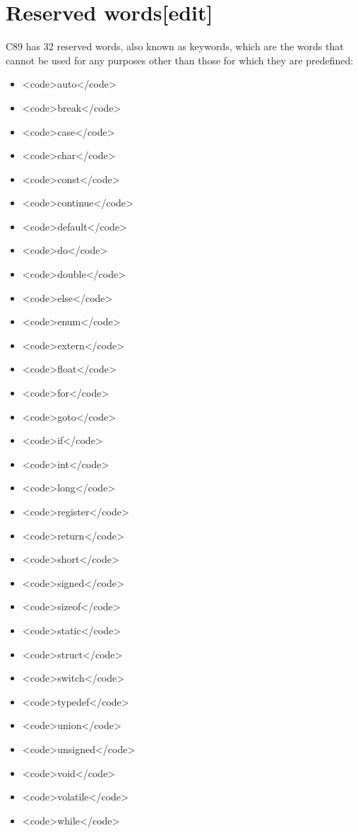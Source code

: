 \documentclass{article}\usepackage{titlesec}
\begin{document}
\section{Reserved words[edit]}
C89 has 32 reserved words, also known as keywords, which are the words that cannot be used for any purposes other than those for which they are predefined:
\\


\begin{itemize}\item<code>auto</code>
\item<code>break</code>
\item<code>case</code>
\item<code>char</code>
\item<code>const</code>
\item<code>continue</code>
\item<code>default</code>
\item<code>do</code>
\item<code>double</code>
\item<code>else</code>
\item<code>enum</code>
\item<code>extern</code>
\item<code>float</code>
\item<code>for</code>
\item<code>goto</code>
\item<code>if</code>
\item<code>int</code>
\item<code>long</code>
\item<code>register</code>
\item<code>return</code>
\item<code>short</code>
\item<code>signed</code>
\item<code>sizeof</code>
\item<code>static</code>
\item<code>struct</code>
\item<code>switch</code>
\item<code>typedef</code>
\item<code>union</code>
\item<code>unsigned</code>
\item<code>void</code>
\item<code>volatile</code>
\item<code>while</code>\end{itemize}
\end{document}
